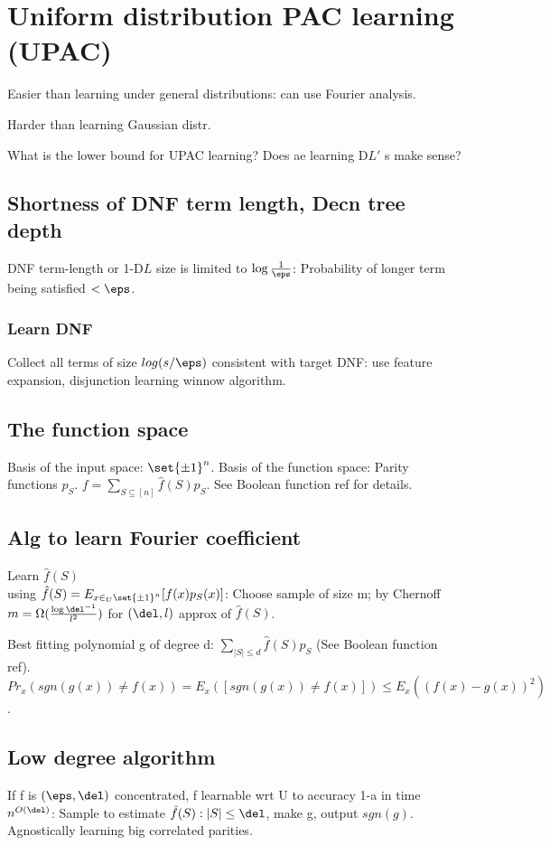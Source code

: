 \documentclass[oneside, article]{memoir}
\begin{document}
\section{Uniform distribution PAC learning (UPAC)}
Easier than learning under general distributions: can use Fourier analysis.

Harder than learning Gaussian distr. \why

\oprob What is the lower bound for UPAC learning? Does ae learning D$L'$ s make sense?

\subsection{Shortness of DNF term length, Decn tree depth}
DNF term-length or 1-D$L$ size is limited to $\log \frac{1}{\eps}$: Probability of longer term being satisfied $< \eps$.


\subsubsection{Learn DNF}
Collect all terms of size $log(s/\eps)$ consistent with target DNF: use feature expansion, disjunction learning winnow algorithm.

\subsection{The function space}
Basis of the input space: $\set{\pm1}^{n}$. Basis of the function space: Parity functions $p_{S}$. $f = \sum_{S\subseteq [n]} \hat{f}(S)p_{S}$. See Boolean function ref for details.

\subsection{Alg to learn Fourier coefficient}
Learn $\hat{f}(S)$\\
 using $\hat{f}(S) = E_{x \in_{U} \set{\pm 1}^{n}}[f(x)p_{S}(x)]$: Choose sample of size m; by Chernoff $m = \Omega(\frac{\log \del^{-1}}{l^{2}})$ for $(\del, l)$ approx of $\hat{f}(S)$.

Best fitting polynomial g of degree d: $\sum_{|S|\leq d} \hat{f}(S)p_{S}$ (See Boolean function ref). $Pr_{x}(sgn(g(x)) \neq f(x)) = E_{x}([sgn(g(x)) \neq f(x)]) \leq E_{x}((f(x)-g(x))^{2})$.

\subsection{Low degree algorithm}
If f is $(\eps,\del)$ concentrated, f learnable wrt U to accuracy 1-a in time $n^{O(\del)}$: Sample to estimate $\hat{f}(S): |S|\leq \del$, make g, output $sgn(g)$. Agnostically learning big correlated parities.
\end{document}
